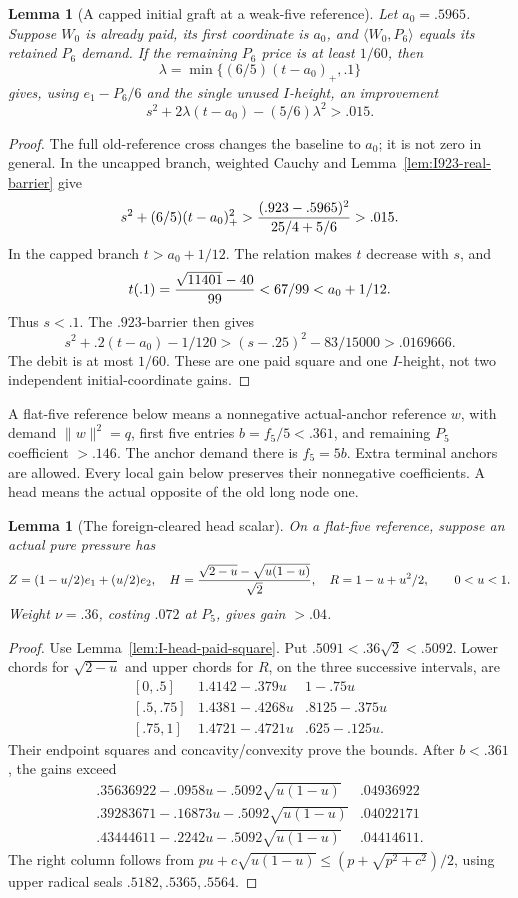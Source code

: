 \documentclass[11pt]{article}
\newtheorem{lemma}[theorem]{Lemma}
\theoremstyle{definition}
\theoremstyle{remark}
\newcommand{\ip}[2]{\langle #1,#2\rangle}
\newcommand{\norm}[1]{\lVert #1\rVert}
\begin{document}
\begin{lemma}[A capped initial graft at a weak-five reference]
\label{lem:I-capped-initial-graft}
Let \(a_0=.5965\). Suppose \(W_0\) is already paid, its first
coordinate is \(a_0\), and \(\ip{W_0}{P_6}\) equals its retained
\(P_6\) demand. If the remaining \(P_6\) price is at least \(1/60\),
then
\[
 \lambda=\min\{(6/5)(t-a_0)_+,.1\}
\]
gives, using \(e_1-P_6/6\) and the single unused \(I\)-height,
an improvement
\[
 s^2+2\lambda(t-a_0)-(5/6)\lambda^2>.015.
\]
\end{lemma}
\begin{proof}
The full old-reference cross changes the baseline to \(a_0\);
it is not zero in general. In the uncapped branch, weighted Cauchy
and Lemma~\ref{lem:I923-real-barrier} give
\[
 s^2+(6/5)(t-a_0)_+^2>
 {(.923-.5965)^2\over25/4+5/6}>.015.
\]
In the capped branch \(t>a_0+1/12\). The relation makes \(t\)
decrease with \(s\), and
\[
 t(.1)={\sqrt{11401}-40\over99}<67/99<a_0+1/12.
\]
Thus \(s<.1\). The \(.923\)-barrier then gives
\[
 s^2+.2(t-a_0)-1/120>
 (s-.25)^2-83/15000>.0169666.
\]
The debit is at most \(1/60\). These are one paid square and one
\(I\)-height, not two independent initial-coordinate gains.
\end{proof}

A flat-five reference below means a nonnegative actual-anchor reference
\(w\), with demand \(\norm w^2=q\), first five entries
\(b=f_5/5<.361\), and remaining \(P_5\) coefficient \(>.146\).
The anchor demand there is \(f_5=5b\). Extra terminal anchors are allowed.
Every local gain below preserves their nonnegative coefficients.
A head means the actual opposite of the old long node one.

\begin{lemma}[The foreign-cleared head scalar]
\label{lem:I-cleared-head-flat-gain}
On a flat-five reference, suppose an actual pure pressure has
\[
 Z=(1-u/2)e_1+(u/2)e_2,\quad
 H={\sqrt{2-u}-\sqrt{u(1-u)}\over\sqrt2},\quad
 R=1-u+u^2/2,\qquad 0<u<1.
\]
Weight \(\nu=.36\), costing \(.072\) at \(P_5\), gives gain \(>.04\).
\end{lemma}
\begin{proof}
Use Lemma~\ref{lem:I-head-paid-square}. Put
\(.5091<.36\sqrt2<.5092\). Lower chords for \(\sqrt{2-u}\)
and upper chords for \(R\), on the three successive intervals, are
\[
\begin{array}{c|c|c}
{}[0,.5]&1.4142-.379u&1-.75u\\
{}[.5,.75]&1.4381-.4268u&.8125-.375u\\
{}[.75,1]&1.4721-.4721u&.625-.125u.
\end{array}
\]
Their endpoint squares and concavity/convexity prove the bounds.
After \(b<.361\), the gains exceed
\[
\begin{array}{c|c}
.35636922-.0958u-.5092\sqrt{u(1-u)}&.04936922\\
.39283671-.16873u-.5092\sqrt{u(1-u)}&.04022171\\
.43444611-.2242u-.5092\sqrt{u(1-u)}&.04414611.
\end{array}
\]
The right column follows from
\(pu+c\sqrt{u(1-u)}\le(p+\sqrt{p^2+c^2})/2\),
using upper radical seals \(.5182,.5365,.5564\).
\end{proof}
\end{document}
